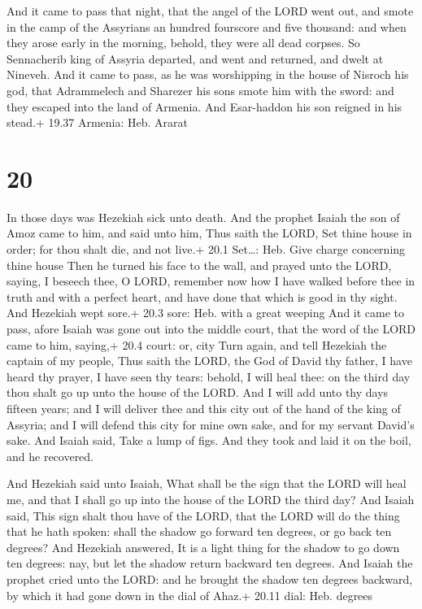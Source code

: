  And it came to pass that night, that the angel of the
LORD went out, and smote in the camp of the Assyrians an hundred
fourscore and five thousand: and when they arose early in the morning,
behold, they were all dead corpses.  So Sennacherib king of
Assyria departed, and went and returned, and dwelt at Nineveh.
 And it came to pass, as he was worshipping in the house of
Nisroch his god, that Adrammelech and Sharezer his sons smote him with
the sword: and they escaped into the land of Armenia. And Esar-haddon
his son reigned in his stead.+ 19.37 Armenia: Heb. Ararat

\hypertarget{section-19}{%
\section{20}\label{section-19}}

 In those days was Hezekiah sick unto death. And the prophet
Isaiah the son of Amoz came to him, and said unto him, Thus saith the
LORD, Set thine house in order; for thou shalt die, and not live.+ 20.1
Set\ldots: Heb. Give charge concerning thine house  Then he
turned his face to the wall, and prayed unto the LORD, saying,
 I beseech thee, O LORD, remember now how I have walked
before thee in truth and with a perfect heart, and have done that which
is good in thy sight. And Hezekiah wept sore.+ 20.3 sore: Heb. with a
great weeping  And it came to pass, afore Isaiah was gone
out into the middle court, that the word of the LORD came to him,
saying,+ 20.4 court: or, city  Turn again, and tell Hezekiah
the captain of my people, Thus saith the LORD, the God of David thy
father, I have heard thy prayer, I have seen thy tears: behold, I will
heal thee: on the third day thou shalt go up unto the house of the LORD.
 And I will add unto thy days fifteen years; and I will
deliver thee and this city out of the hand of the king of Assyria; and I
will defend this city for mine own sake, and for my servant David's
sake.  And Isaiah said, Take a lump of figs. And they took
and laid it on the boil, and he recovered.

 And Hezekiah said unto Isaiah, What shall be the sign
that the LORD will heal me, and that I shall go up into the house of the
LORD the third day?  And Isaiah said, This sign shalt thou
have of the LORD, that the LORD will do the thing that he hath spoken:
shall the shadow go forward ten degrees, or go back ten degrees?
 And Hezekiah answered, It is a light thing for the shadow
to go down ten degrees: nay, but let the shadow return backward ten
degrees.  And Isaiah the prophet cried unto the LORD: and
he brought the shadow ten degrees backward, by which it had gone down in
the dial of Ahaz.+ 20.11 dial: Heb. degrees

